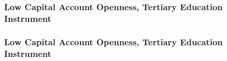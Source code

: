 \documentclass{beamer}
\begin{document}
    \begin{frame}
        \frametitle{Low Capital Account Openness, Tertiary Education Instrument}
        {
            \let\oldcentering\centering
            \renewcommand\centering{\tiny\oldcentering}
            
        }
    \end{frame}

    \begin{frame}
        \frametitle{Low Capital Account Openness, Tertiary Education Instrument}
        {
            \let\oldcentering\centering
            \renewcommand\centering{\tiny\oldcentering}
            
        }
    \end{frame}
\end{document}

